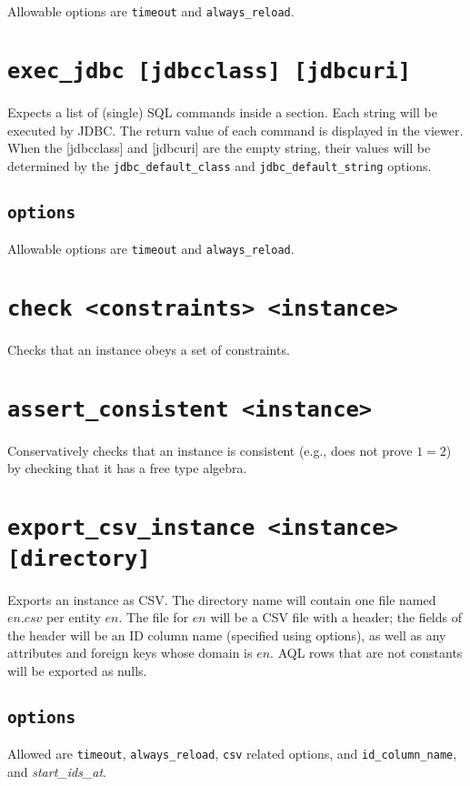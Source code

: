 \documentclass[10pt]{book}
\begin{document}
Allowable options are {\tt timeout} and {\tt always\_reload}.

\section{{\tt exec\_jdbc [jdbcclass] [jdbcuri]}}
Expects a list of (single) SQL commands inside a section.  Each string will be executed by JDBC.  The return value of each command is displayed in the viewer.  When the [jdbcclass] and [jdbcuri] are the empty string, their values will be determined by the {\tt jdbc\_default\_class} and {\tt jdbc\_default\_string} options.

\subsection{{\tt options}}

Allowable options are {\tt timeout} and {\tt always\_reload}.

\section{{\tt check <constraints> <instance>}}

Checks that an instance obeys a set of constraints.

\section{{\tt assert\_consistent <instance>}}

Conservatively checks that an instance is consistent (e.g., does not prove $1=2$) by checking that it has a free type algebra.


\section{{\tt export\_csv\_instance <instance> [directory]}} 

Exports an instance as CSV.  The directory name will contain one file named $en.csv$ per entity $en$.  The file for $en$ will be a CSV file with a header; the fields of the header will be an ID column name (specified using options), as well as any attributes and foreign keys whose domain is $en$.   AQL rows that are not constants will be exported as nulls.  

\subsection{{\tt options}}
Allowed are {\tt timeout}, {\tt always\_reload}, {\tt csv} related options, and {\tt id\_column\_name}, and {\it start\_ids\_at}.
\end{document}
